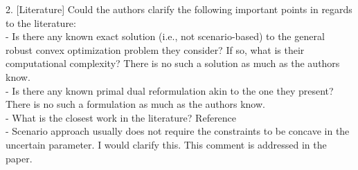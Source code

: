 \documentclass[journal,twoside,web]{ieeecolor}
\begin{document}
2. [Literature]
Could the authors clarify the following important points in regards to the literature:\\
- {\color{red}Is there any known exact solution (i.e., not scenario-based) to the general robust convex optimization problem they consider? If so, what is their computational complexity?} {\color{blue} There is no such a solution as much as the authors know.}\\
- {\color{red}Is there any known primal dual reformulation akin to the one they present?} {\color{blue} There is no such a formulation as much as the authors know.}\\
- {\color{red}What is the closest work in the literature?} {\color{blue} Reference \cite{cherukuri2016}}\\
- {\color{red}Scenario approach usually does not require the constraints to be concave in the uncertain parameter. I would clarify this.} {\color{blue} This comment is addressed in the paper.}
\end{document}

